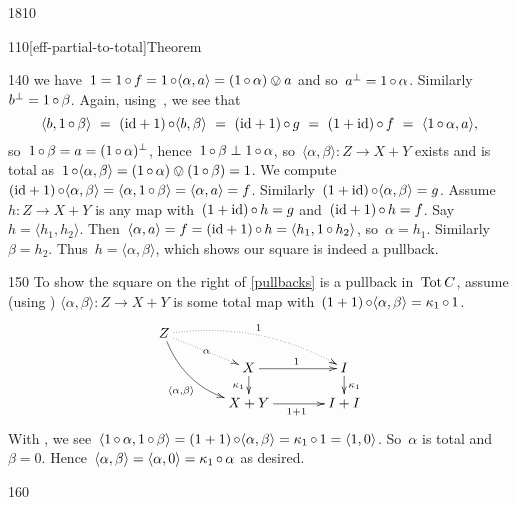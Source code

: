 \begin{parsec}{1810}
\begin{point}{110}[eff-partial-to-total]{Theorem}
\begin{point}{140}
    we have~$1 = 1 \mathop{\circ} f = 1 \mathop{\circ} \langle \alpha, a\rangle
                = (1 \mathop{\circ} \alpha) \ovee a$
        and so~$a^\perp = 1\mathop{\circ} \alpha$.
Similarly~$b^\perp = 1 \mathop{\circ} \beta$.
Again, using~,
    we see that
\begin{equation*}
    \langle b, 1 \after \beta \rangle \ =\ 
    (\id + 1) \after \langle b, \beta \rangle \ =\ 
    (\id + 1) \after g \ =\ 
    (1 + \id) \after f
               \  = \ \langle 1 \after \alpha, a\rangle,
\end{equation*}
so~$1 \mathop{\circ} \beta = a = (1 \mathop{\circ} \alpha)^\perp$,
hence~$1 \mathop{\circ} \beta \perp 1 \mathop{\circ} \alpha$,
so~$\langle \alpha,\beta\rangle \colon Z \to X+Y$ exists
    and is total as~$1 \mathop{\circ} \langle \alpha,\beta\rangle = 
        (1 \mathop{\circ} \alpha) \ovee (1 \mathop{\circ} \beta) = 1$.
We compute~$(\mathrm{id} + 1) \mathop{\circ} \langle\alpha, \beta\rangle = \langle \alpha,
    1 \mathop{\circ} \beta\rangle = \langle \alpha, a\rangle = f$.
    Similarly~$(1 + \mathrm{id}) \mathop{\circ} \langle \alpha, \beta\rangle = g$.
    Assume~$h\colon Z \to X+Y$ is any map with~$(1 +\mathrm{id}) \mathop{\circ} h
        = g$ and~$(\mathrm{id}+1) \mathop{\circ} h = f$.
Say~$h = \langle h_1, h_2 \rangle$.
Then~$\langle \alpha, a\rangle = f= (\mathrm{id} + 1)\mathop{\circ} h = \langle h_1, 1 \mathop{\circ} h_2 \rangle$, so~$\alpha = h_1$. Similarly~$\beta=h_2$.
Thus~$h = \langle \alpha, \beta\rangle$,
    which shows our square is indeed a pullback.
\end{point}
\begin{point}{150}%
To show the square on the right of \eqref{pullbacks} is a pullback
    in~$\operatorname{Tot} C$,
assume (using )
$\langle \alpha, \beta \rangle\colon Z \to X+Y$
is some total map
with~$(1+1) \mathop{\circ} \langle\alpha,\beta\rangle = \kappa_1 \mathop{\circ} 1$.
    \begin{equation*}
\xymatrix@C+1pc@R-1pc{ 
    Z \ar@{.>}@/^1pc/[rrd]^{1}
    \ar@/_1pc/[rdd]_{\langle \alpha,\beta\rangle}
    \ar@{.>}[rd]|{\alpha}\\
    &X \ar[r]^{1} \ar[d]_{\kappa_1} & I \ar[d]^{\kappa_1} \\
    &X+Y\ar[r]_{1+1} & I+I
    }
    \end{equation*}
With ,
we see~$\langle 1 \mathop{\circ} \alpha, 1 \mathop{\circ} \beta \rangle
        = (1 + 1) \mathop{\circ} \langle \alpha, \beta \rangle
        = \kappa_1 \mathop{\circ} 1
        = \langle 1, 0 \rangle$.
So~$\alpha$ is total and~$\beta=0$.
Hence~$\langle \alpha, \beta\rangle = \langle \alpha, 0\rangle
        = \kappa_1 \mathop{\circ} \alpha$ as desired.
\end{point}
\begin{point}{160}%

\end{point}
\end{point}
\end{parsec}
